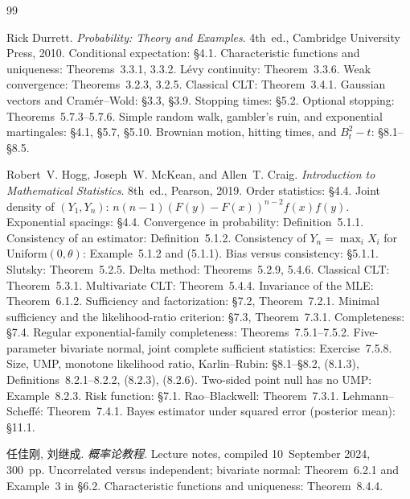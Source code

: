 \documentclass[11pt,a4paper]{article}
\begin{document}
\begin{thebibliography}{99}

Rick Durrett.
\newblock \emph{Probability: Theory and Examples}.
\newblock 4th~ed., Cambridge University Press, 2010.
\newblock Conditional expectation: \S4.1. Characteristic functions and uniqueness: Theorems~3.3.1, 3.3.2. L\'evy continuity: Theorem~3.3.6. Weak convergence: Theorems~3.2.3, 3.2.5. Classical CLT: Theorem~3.4.1. Gaussian vectors and Cram\'er--Wold: \S3.3, \S3.9. Stopping times: \S5.2. Optional stopping: Theorems~5.7.3--5.7.6. Simple random walk, gambler's ruin, and exponential martingales: \S4.1, \S5.7, \S5.10. Brownian motion, hitting times, and \( B_t^{2}-t \): \S8.1--\S8.5.

Robert~V. Hogg, Joseph~W. McKean, and Allen~T. Craig.
\newblock \emph{Introduction to Mathematical Statistics}.
\newblock 8th~ed., Pearson, 2019.
\newblock Order statistics: \S4.4. Joint density of \( (Y_{1},Y_{n}) \): \( n(n-1)(F(y)-F(x))^{n-2}f(x)f(y) \). Exponential spacings: \S4.4. Convergence in probability: Definition~5.1.1. Consistency of an estimator: Definition~5.1.2. Consistency of \( Y_n=\max_i X_i \) for Uniform\( (0,\theta) \): Example~5.1.2 and (5.1.1). Bias versus consistency: \S5.1.1. Slutsky: Theorem~5.2.5. Delta method: Theorems~5.2.9, 5.4.6. Classical CLT: Theorem~5.3.1. Multivariate CLT: Theorem~5.4.4. Invariance of the MLE: Theorem~6.1.2. Sufficiency and factorization: \S7.2, Theorem~7.2.1. Minimal sufficiency and the likelihood-ratio criterion: \S7.3, Theorem~7.3.1. Completeness: \S7.4. Regular exponential-family completeness: Theorems~7.5.1--7.5.2. Five-parameter bivariate normal, joint complete sufficient statistics: Exercise~7.5.8. Size, UMP, monotone likelihood ratio, Karlin--Rubin: \S8.1--\S8.2, (8.1.3), Definitions~8.2.1--8.2.2, (8.2.3), (8.2.6). Two-sided point null has no UMP: Example~8.2.3. Risk function: \S7.1. Rao--Blackwell: Theorem~7.3.1. Lehmann--Scheff\'e: Theorem~7.4.1. Bayes estimator under squared error (posterior mean): \S11.1.

任佳刚, 刘继成.
\newblock \emph{概率论教程}.
\newblock Lecture notes, compiled 10~September 2024, 300~pp.
\newblock Uncorrelated versus independent; bivariate normal: Theorem~6.2.1 and Example~3 in \S6.2. Characteristic functions and uniqueness: Theorem~8.4.4.

\end{thebibliography}
\end{document}
